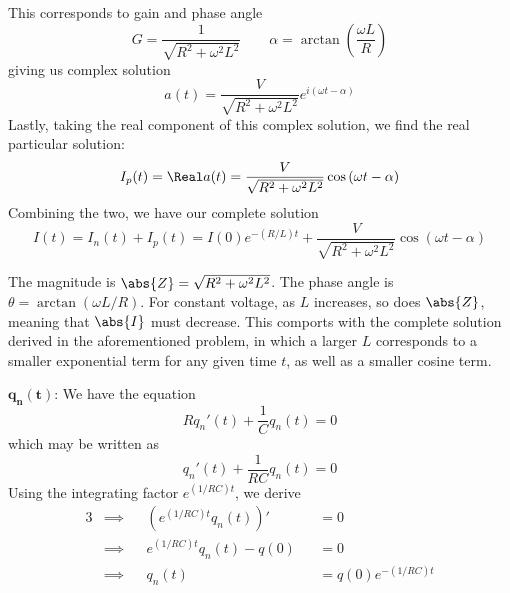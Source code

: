 \documentclass[a4paper]{article}
\begin{document}
This corresponds to gain and phase angle
\[
	G = \frac{1}{\sqrt{R^{2} + \omega^{2} L^{2}}} \qquad \alpha = \arctan \!\left( \frac{\omega L}{R} \right) 
\]
giving us complex solution
\[
	a \!\left( t \right) = \frac{V}{\sqrt{R^{2} + \omega^{2}L^{2}}}e^{i \!\left( \omega t - \alpha  \right) }
\]
Lastly, taking the real component of this complex solution, we find the real particular solution:
\[
	I_{p} \!\left( t \right) = \Real a \!\left( t \right) = \frac{V}{\sqrt{R^{2} + \omega^{2}L^{2}}} \cos\left( \omega t - \alpha  \right)
\]
Combining the two, we have our complete solution
\[
	I \!\left( t \right) = I_{n} \!\left( t \right) + I_{p} \!\left( t \right) = I \!\left( 0 \right) e^{-\!\left( R/L \right) t} + \frac{V}{\sqrt{R^{2} + \omega^{2}L^{2}}} \cos\left( \omega t - \alpha  \right)
\]


The magnitude is \(\abs{Z} = \sqrt{R^{2} + \omega^{2}L^{2}}\). The phase angle is \(\theta = \arctan \!\left( \omega L/R \right) \). For constant voltage, as \(L\) increases, so does \(\abs{Z}\), meaning that \(\abs{I}\)  must decrease. This comports with the complete solution derived in the aforementioned problem, in which a larger \(L\) corresponds to a smaller exponential term for any given time \(t\), as well as a smaller cosine term.

\vspace{12pt}


\(\bm{q_{n} \!\left( t \right) }\): We have the equation
\[
	R q_{n}' \!\left( t \right) + \frac{1}{C} q_{n} \!\left( t \right) = 0
\]
which may be written as
\[
	q_{n}' \!\left( t \right) + \frac{1}{RC} q_{n} \!\left( t \right) = 0
\]
Using the integrating factor \(e^{\!\left( 1/RC \right) t}\), we derive
\begin{alignat*}{3}
	&\implies && \!\left( e^{\!\left( 1/RC \right) t} q_{n} \!\left( t \right) \right)' && = 0  \\
	&\implies && e^{\!\left( 1/RC \right) t} q_{n} \!\left( t \right) - q \!\left( 0 \right) && = 0  \\
	&\implies && q_{n} \!\left( t \right) && = q \!\left( 0 \right)  e^{-\!\left( 1/RC \right) t}
\end{alignat*}
\end{document}
